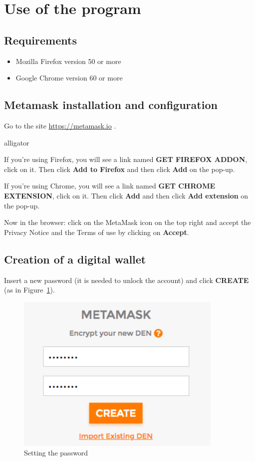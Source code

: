 \section{Use of the program}
\subsection{Requirements}
\begin{itemize}
	\item Mozilla Firefox version 50 or more
	\item Google Chrome version 60 or more
\end{itemize}

\subsection{Metamask installation and configuration}
Go to the site \url{https://metamask.io} . 

\begin{labeling}{alligator}
	\item If you're using Firefox, you will see a link named \textbf{GET FIREFOX ADDON}, click on it. Then click \textbf{Add to Firefox} and then click \textbf{Add} on the pop-up.
	\item If you're using Chrome, you will see a link named \textbf{GET CHROME EXTENSION}, click on it. Then click \textbf{Add} and then click \textbf{Add extension} on the pop-up.
\end{labeling}
Now in the browser: click on the MetaMask icon on the top right and accept the Privacy Notice and the Terms of use by clicking on \textbf{Accept}.

\subsection{Creation of a digital wallet}
Insert a new password (it is needed to unlock the account) and click \textbf{CREATE} (as in Figure~\ref{fig:password}).
\begin{figure}[!h]
	\centering
	\includegraphics[height=3in]{img/password.png}
	\caption{Setting the password}
	\label{fig:password}
\end{figure}

